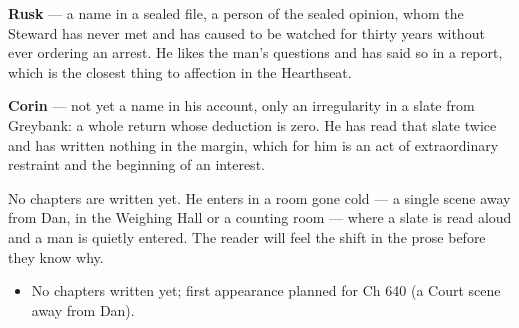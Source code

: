 \documentclass{design/chronicle}
\begin{document}
{\textbf{Rusk} — a name in a sealed file, a person of the sealed opinion, whom the Steward has never met and has caused to be watched for thirty years without ever ordering an arrest. He likes the man’s questions and has said so in a report, which is the closest thing to affection in the Hearthseat.

\textbf{Corin} — not yet a name in his account, only an irregularity in a slate from Greybank: a whole return whose deduction is zero. He has read that slate twice and has written nothing in the margin, which for him is an act of extraordinary restraint and the beginning of an interest.

No chapters are written yet. He enters in a room gone cold — a single scene away from Dan, in the Weighing Hall or a counting room — where a slate is read aloud and a man is quietly entered. The reader will feel the shift in the prose before they know why.

\begin{itemize}[leftmargin=1.4em,itemsep=1pt,topsep=3pt,parsep=0pt]

\item No chapters written yet; first appearance planned for Ch 640 (a Court scene away from Dan).

\end{itemize}
}
\end{document}
